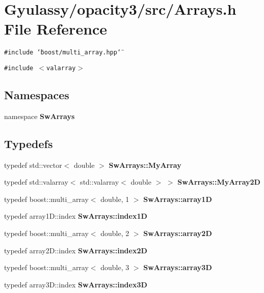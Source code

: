 \section{Gyulassy/opacity3/src/Arrays.h File Reference}
\label{Arrays_8h}
{\tt \#include \char`\"{}boost/multi\_\-array.hpp\char`\"{}}\par
{\tt \#include $<$valarray$>$}\par
\subsection*{Namespaces}
\begin{CompactItemize}
\item 
namespace {\bf SwArrays}
\end{CompactItemize}
\subsection*{Typedefs}
\begin{CompactItemize}
\item 
typedef std::vector$<$ double $>$ {\bf SwArrays::MyArray}
\item 
typedef std::valarray$<$ std::valarray$<$ double $>$ $>$ {\bf SwArrays::MyArray2D}
\item 
typedef boost::multi\_\-array$<$ double, 1 $>$ {\bf SwArrays::array1D}
\item 
typedef array1D::index {\bf SwArrays::index1D}
\item 
typedef boost::multi\_\-array$<$ double, 2 $>$ {\bf SwArrays::array2D}
\item 
typedef array2D::index {\bf SwArrays::index2D}
\item 
typedef boost::multi\_\-array$<$ double, 3 $>$ {\bf SwArrays::array3D}
\item 
typedef array3D::index {\bf SwArrays::index3D}
\end{CompactItemize}
